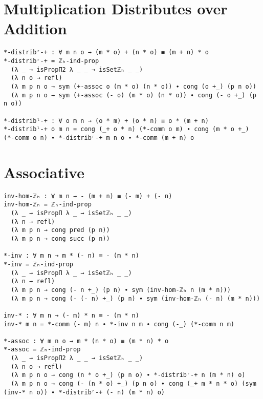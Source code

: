 \section{Multiplication Distributes over Addition}
\begin{verbatim}
*-distribʳ-+ : ∀ m n o → (m * o) + (n * o) ≡ (m + n) * o
*-distribʳ-+ = ℤₕ-ind-prop
  (λ _ → isPropΠ2 λ _ _ → isSetℤₕ _ _)
  (λ n o → refl)
  (λ m p n o → sym (+-assoc o (m * o) (n * o)) ∙ cong (o +_) (p n o))
  (λ m p n o → sym (+-assoc (- o) (m * o) (n * o)) ∙ cong (- o +_) (p n o))

*-distribˡ-+ : ∀ o m n → (o * m) + (o * n) ≡ o * (m + n)
*-distribˡ-+ o m n = cong (_+ o * n) (*-comm o m) ∙ cong (m * o +_) (*-comm o n) ∙ *-distribʳ-+ m n o ∙ *-comm (m + n) o
\end{verbatim}

\section{Associative}
\begin{verbatim}
inv-hom-ℤₕ : ∀ m n → - (m + n) ≡ (- m) + (- n)
inv-hom-ℤₕ = ℤₕ-ind-prop
  (λ _ → isPropΠ λ _ → isSetℤₕ _ _)
  (λ n → refl)
  (λ m p n → cong pred (p n))
  (λ m p n → cong succ (p n))

*-inv : ∀ m n → m * (- n) ≡ - (m * n)
*-inv = ℤₕ-ind-prop
  (λ _ → isPropΠ λ _ → isSetℤₕ _ _)
  (λ n → refl)
  (λ m p n → cong (- n +_) (p n) ∙ sym (inv-hom-ℤₕ n (m * n)))
  (λ m p n → cong (- (- n) +_) (p n) ∙ sym (inv-hom-ℤₕ (- n) (m * n)))

inv-* : ∀ m n → (- m) * n ≡ - (m * n)
inv-* m n = *-comm (- m) n ∙ *-inv n m ∙ cong (-_) (*-comm n m)

*-assoc : ∀ m n o → m * (n * o) ≡ (m * n) * o
*-assoc = ℤₕ-ind-prop
  (λ _ → isPropΠ2 λ _ _ → isSetℤₕ _ _)
  (λ n o → refl)
  (λ m p n o → cong (n * o +_) (p n o) ∙ *-distribʳ-+ n (m * n) o)
  (λ m p n o → cong (- (n * o) +_) (p n o) ∙ cong (_+ m * n * o) (sym (inv-* n o)) ∙ *-distribʳ-+ (- n) (m * n) o)
\end{verbatim}
